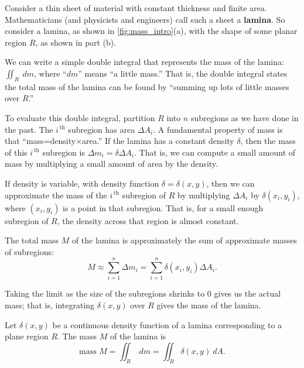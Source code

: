 Consider a thin sheet of material with constant thickness and finite area. Mathematicians (and physicists and engineers) call such a sheet a \textbf{lamina}. So consider a lamina, as shown in \autoref{fig:mass_intro}(a),  with the shape of some planar region $R$, as shown in part (b).

We can write a simple double integral that represents the mass of the lamina: $\iint_R\ dm$, where ``$dm$'' means ``a little mass.'' That is, the double integral states the total mass of the lamina can be found by ``summing up lots of little masses over $R$.''

To evaluate this double integral, partition $R$ into $n$ subregions as we have done in the past. The $i^{\,\text{th}}$ subregion has area $\Delta A_i$. 
A fundamental property of mass is that ``mass=density$\times$area.'' If the lamina has a constant density $\delta$, then the mass of this $i^{\,\text{th}}$ subregion is $\Delta m_i=\delta\Delta A_i$. %
That is, we can compute a small amount of mass by multiplying a small amount of area by the density.

If density is variable, with density function $\delta= \delta(x,y)$, then we can approximate the mass of the $i^{\,\text{th}}$ subregion of $R$ by multiplying $\Delta A_i$ by $\delta(x_i,y_i)$, where $(x_i,y_i)$ is a point in that subregion. That is, for a small enough subregion of $R$, the density across that region is almost constant. 


The total mass $M$ of the lamina is approximately the sum of approximate masses of subregions:
\[M \approx \sum_{i=1}^n \Delta m_i = \sum_{i=1}^n \delta(x_i,y_i)\Delta A_i.\]

Taking the limit as the size of the subregions shrinks to 0 gives us the actual mass; that is, integrating $\delta(x,y)$ over $R$ gives the mass of the lamina.

{Let $\delta(x,y)$ be a continuous density function of a lamina corresponding to a plane region $R$. The mass $M$ of the lamina is
\[\text{mass } M = \iint_R\ dm = \iint_R \delta(x,y)\ dA.\]}


